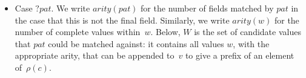 \begin{itemize}
\item Case $?pat$.  We write $arity(pat)$ for the number of fields matched by
  $pat$ in the case that this is not the final field.  Similarly, we write
  $arity(w)$ for the number of complete values within~$w$.  Below, $W$ is the
  set of candidate values that $pat$ could be matched against: it contains all
  values $w$, with the appropriate arity, that can be appended to~$v$ to give
  a prefix of an element of~$\rho(c)$.
%
\end{itemize}
